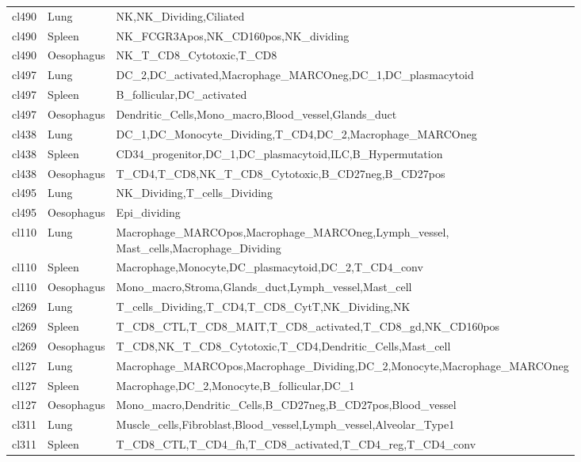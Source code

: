\begin{table}[pht!]
\begin{tabular}{lll}
  cl490 & Lung & NK,NK\_Dividing,Ciliated \\ 
  cl490 & Spleen & NK\_FCGR3Apos,NK\_CD160pos,NK\_dividing \\ 
  cl490 & Oesophagus & NK\_T\_CD8\_Cytotoxic,T\_CD8 \\ 
  cl497 & Lung & DC\_2,DC\_activated,Macrophage\_MARCOneg,DC\_1,DC\_plasmacytoid \\ 
  cl497 & Spleen & B\_follicular,DC\_activated \\ 
  cl497 & Oesophagus & Dendritic\_Cells,Mono\_macro,Blood\_vessel,Glands\_duct \\ 
  cl438 & Lung & DC\_1,DC\_Monocyte\_Dividing,T\_CD4,DC\_2,Macrophage\_MARCOneg \\ 
  cl438 & Spleen & CD34\_progenitor,DC\_1,DC\_plasmacytoid,ILC,B\_Hypermutation \\ 
  cl438 & Oesophagus & T\_CD4,T\_CD8,NK\_T\_CD8\_Cytotoxic,B\_CD27neg,B\_CD27pos \\ 
  cl495 & Lung & NK\_Dividing,T\_cells\_Dividing \\ 
  cl495 & Oesophagus & Epi\_dividing \\ 
  cl110 & Lung & \specialcell[t]{Macrophage\_MARCOpos,Macrophage\_MARCOneg,Lymph\_vessel,\\Mast\_cells,Macrophage\_Dividing} \\ 
  cl110 & Spleen & Macrophage,Monocyte,DC\_plasmacytoid,DC\_2,T\_CD4\_conv \\ 
  cl110 & Oesophagus & Mono\_macro,Stroma,Glands\_duct,Lymph\_vessel,Mast\_cell \\ 
  cl269 & Lung & T\_cells\_Dividing,T\_CD4,T\_CD8\_CytT,NK\_Dividing,NK \\ 
  cl269 & Spleen & T\_CD8\_CTL,T\_CD8\_MAIT,T\_CD8\_activated,T\_CD8\_gd,NK\_CD160pos \\ 
  cl269 & Oesophagus & T\_CD8,NK\_T\_CD8\_Cytotoxic,T\_CD4,Dendritic\_Cells,Mast\_cell \\ 
  cl127 & Lung & Macrophage\_MARCOpos,Macrophage\_Dividing,DC\_2,Monocyte,Macrophage\_MARCOneg \\ 
  cl127 & Spleen & Macrophage,DC\_2,Monocyte,B\_follicular,DC\_1 \\ 
  cl127 & Oesophagus & Mono\_macro,Dendritic\_Cells,B\_CD27neg,B\_CD27pos,Blood\_vessel \\ 
  cl311 & Lung & Muscle\_cells,Fibroblast,Blood\_vessel,Lymph\_vessel,Alveolar\_Type1 \\ 
  cl311 & Spleen & T\_CD8\_CTL,T\_CD4\_fh,T\_CD8\_activated,T\_CD4\_reg,T\_CD4\_conv \\ 

\end{tabular}
\end{table}
